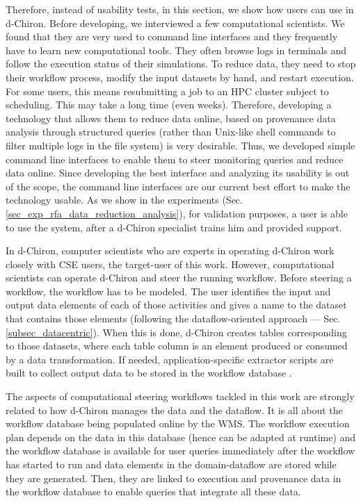 Therefore, instead of usability tests, in this section, we show how
users can use  in d-Chiron. Before
developing, we interviewed  a few computational scientists. We found that
they are very used to command line interfaces and they frequently have
to learn new computational tools. They often browse logs in terminals
and follow the execution status of their simulations. To reduce data, they
need to stop their workflow process, modify the input datasets by hand,
and restart execution. For some users, this means resubmitting a job to
an HPC cluster subject to scheduling. This may take  a long time (even
weeks). Therefore, developing a technology that allows them to reduce
data online, based on provenance data analysis through structured
queries (rather than Unix-like shell commands to filter multiple logs in
the file system) is very desirable. Thus,
we developed simple command line interfaces to enable them to steer
monitoring queries and reduce data online. Since developing the best
interface and analyzing its usability is out of the scope, the command
line interfaces are our current best effort to make the technology
usable. As we show in the experiments (Sec. \ref{sec_exp_rfa_data_reduction_analysis}), for validation purposes, a user is
able to use the system, after a d-Chiron specialist trains him and
provided support.

In d-Chiron, computer scientists who are experts in operating d-Chiron
work closely with CSE users, the target-user of this
work. However, computational scientists can operate d-Chiron and
steer the running workflow. Before steering a workflow, the workflow has
to be modeled. The user identifies the input and output data elements of
each of those activities and gives a name to the dataset that contains
those elements (following the dataflow-oriented approach --- Sec. \ref{subsec_datacentric}). When this is done, d-Chiron creates tables corresponding
to those datasets, where each table column is an element produced or
consumed by a data transformation.
If needed, application-specific
extractor scripts are built to collect output data to be stored in the
workflow database \cite{Silva2017Raw}.

The aspects of computational steering workflows tackled in this work are
strongly related to how d-Chiron manages the data and the dataflow. It
is all about the workflow database being populated online by the WMS. The
workflow execution plan depends on the data in this database (hence can
be adapted at runtime) and the workflow database is available for user queries
immediately after the workflow has started to run and data elements in
the domain-dataflow are stored while they are generated. Then, they are
linked to execution and provenance data in the workflow database to enable
queries that integrate all these data.

